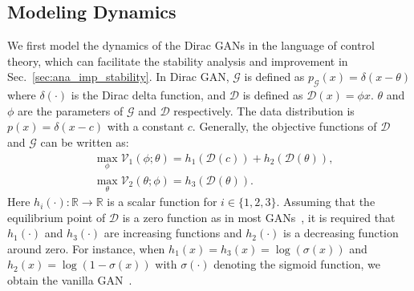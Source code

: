 \documentclass{article}
\newcommand{\xG}{\mathcal{G}}
\newcommand{\xD}{\mathcal{D}}
\newcommand{\uV}{\mathcal{V}}
\newcommand{\Real}{\mathbb{R}}
\newcommand{\secref}[1]{Sec.~\ref{sec:#1}} \usepackage{wrapfig}
\theoremstyle{definition}
\begin{document}
\subsection{Modeling Dynamics}
\label{sec:gan_dynamic_model}



We first model the dynamics of the Dirac GANs in the language of control theory, which can facilitate the stability analysis and improvement in \secref{ana_imp_stability}.
In Dirac GAN, $\xG$ is defined as $p_\xG(x) = \delta(x-\theta)$  where $\delta(\cdot)$ is the Dirac delta function, and $\xD$ is defined as $\xD(x) = \phi x$. $\theta$ and  $\phi$ are the parameters of $\xG$ and $\xD$ respectively. The data distribution is $p(x) = \delta(x - c)$ with a constant $c$. 
Generally, the objective functions of $\xD$ and $\xG$ can be written as:
\begin{align}
& \max_{\phi} \uV_1(\phi; \theta) = h_1(\xD(c)) + h_2(\xD(\theta)), \nonumber\\
& \max_{\theta} \uV_2(\theta; \phi) = h_3(\xD(\theta)).
\end{align}
Here $h_i(\cdot): \Real\to\Real$ is a scalar function for $i\in\{1,2,3\}$.  
Assuming that the equilibrium point of $\xD$ is a zero function as in most GANs~\cite{goodfellow2014generative,arjovsky2017wasserstein}, it is required that $h_1(\cdot)$ and $h_3(\cdot)$ are increasing functions and $h_2(\cdot)$ is a decreasing function around zero. For instance, when $h_1(x) = h_3(x) = \log(\sigma(x))$ and $h_2(x) = \log(1-\sigma(x))$ with $\sigma(\cdot)$ denoting the sigmoid function, we obtain the vanilla GAN~\cite{goodfellow2014generative}.
\end{document}
